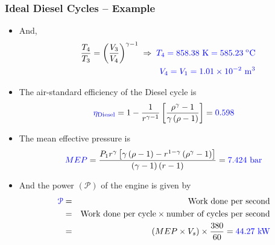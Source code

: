\documentclass[10pt,compress]{beamer}
\begin{document}
\begin{frame}
 \frametitle{Ideal Diesel Cycles --  Example}
    \begin{itemize}
     \item <1-> And,
      \begin{eqnarray}
       && \displaystyle\frac{T_{4}}{T_{3}}=\left(\displaystyle\frac{V_{3}}{V_{4}}\right)^{\gamma-1}\;\Rightarrow\; \textcolor{blue}{T_{4}=858.38\text{ K}=585.23^{\text{ o}}\text{C}} \nonumber \\
       && \textcolor{blue}{V_{4}=V_{1}=1.01\times 10^{-2}\text{ m}^{3}}\nonumber
      \end{eqnarray}
     \item<2-> The air-standard efficiency of the Diesel cycle is
       \begin{displaymath}
        \textcolor{blue}{\eta_{\text{Diesel}}}= 1 -\displaystyle\frac{1}{r^{\gamma-1}}\left[\displaystyle\frac{\rho^{\gamma}-1}{\gamma\left(\rho-1\right)}\right] = \textcolor{blue}{0.598}
       \end{displaymath}        
     \item <3-> The mean effective pressure is
      \begin{displaymath}
       \textcolor{blue}{MEP} = \displaystyle\frac{P_{1}r^{\gamma}\left[\gamma\left(\rho-1\right)-r^{1-\gamma}\left(\rho^{\gamma}-1\right)\right]}{\left(\gamma-1\right)\left(r-1\right)} = \textcolor{blue}{7.424\text{ bar}}
      \end{displaymath}
     \item <4-> And the power $\left(\mathcal{P}\right)$ of the engine is given by
      \begin{eqnarray}
       \textcolor{blue}{\mathcal{P}}&=&\text{Work done per second} \nonumber \\
                                    &=& \text{Work done per cycle} \times \text{number of cycles per second} \nonumber \\
       &=& \left( MEP \times V_{s} \right) \times \displaystyle\frac{380}{60} = \textcolor{blue}{44.27\text{ kW}} \nonumber
      \end{eqnarray}
    \end{itemize}
\end{frame}
\end{document}
